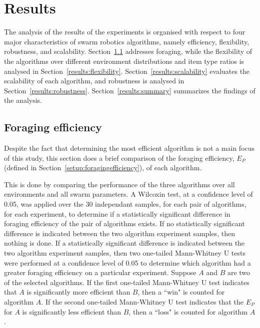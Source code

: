 \chapter{Results}
\label{chap:results}

The analysis of the results of the experiments is organised with respect to four major characteristics of swarm robotics algorithms, namely efficiency, flexibility, robustness, and scalability. Section~\ref{results:efficiency} addresses foraging, while the flexibility of the algorithms over different environment distributions and item type ratios is analysed in Section~\ref{results:flexibility}. Section~\ref{results:scalability} evaluates the scalability of each algorithm, and robustness is analysed in Section~\ref{results:robustness}. Section~\ref{results:summary} summarizes the findings of the analysis.

\section{Foraging efficiency}
\label{results:efficiency}


Despite the fact that determining the most efficient algorithm is not a main focus of this study, this section does a brief comparison of the foraging efficiency, $E_P$ (defined in Section~\ref{setup:foragingefficiency}), of each algorithm. 

This is done by comparing the performance of the three algorithms over all environments and all swarm parameters. A Wilcoxin test, at a confidence level of 0.05, was applied over the 30 independant samples, for each pair of algorithms, for each experiment, to determine if a statistically significant difference in foraging efficiency of the pair of algorithms exists. If no statistically significant difference is indicated between the two algorithm experiment samples, then nothing is done. If a statistically significant difference is indicated between the two algorithm experiment samples, then two one-tailed Mann-Whitney U tests were performed at a confidence level of 0.05 to determine which algorithm had a greater foraging efficiency on a particular experiment. Suppose $A$ and $B$ are two of the selected algorithms. If the first one-tailed Mann-Whitney U test indicates that $A$ is significantly more efficient than $B$, then a ``win" is counted for algorithm $A$. If the second one-tailed Mann-Whitney U test indicates that the $E_P$ for $A$ is significantly less efficient than $B$, then a ``loss" is counted for algorithm $A$. 

